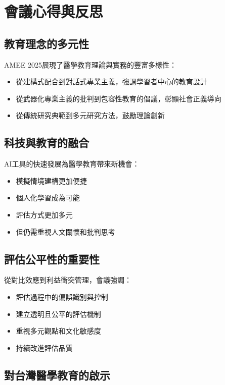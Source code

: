\documentclass[12pt,a4paper]{article}
\begin{document}
\section{會議心得與反思}

\subsection{教育理念的多元性}

AMEE 2025展現了醫學教育理論與實務的豐富多樣性：
\begin{itemize}[nosep]
    \item 從建構式配合到對話式專業主義，強調學習者中心的教育設計
    \item 從武器化專業主義的批判到包容性教育的倡議，彰顯社會正義導向
    \item 從傳統研究典範到多元研究方法，鼓勵理論創新
\end{itemize}

\subsection{科技與教育的融合}

AI工具的快速發展為醫學教育帶來新機會：
\begin{itemize}[nosep]
    \item 模擬情境建構更加便捷
    \item 個人化學習成為可能
    \item 評估方式更加多元
    \item 但仍需重視人文關懷和批判思考
\end{itemize}

\subsection{評估公平性的重要性}

從對比效應到利益衝突管理，會議強調：
\begin{itemize}[nosep]
    \item 評估過程中的偏誤識別與控制
    \item 建立透明且公平的評估機制
    \item 重視多元觀點和文化敏感度
    \item 持續改進評估品質
\end{itemize}

\subsection{對台灣醫學教育的啟示}
\end{document}
